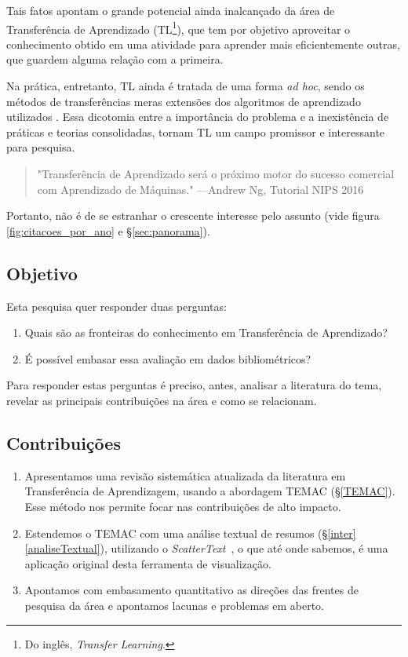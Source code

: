 \documentclass[sigconf]{acmart}
\begin{document}
  Tais fatos apontam  o grande potencial ainda inalcançado da área de Transferência de Aprendizado (TL\footnote{Do inglês, \emph{Transfer Learning}.}), que tem por objetivo aproveitar o conhecimento obtido em uma atividade para aprender mais eficientemente outras, que guardem alguma relação com a primeira.
  
  Na prática, entretanto, TL ainda é tratada de uma forma \textit{ad hoc}, sendo os métodos de transferências meras extensões dos algoritmos de aprendizado utilizados \cite{torrey}. Essa dicotomia entre a importância do problema e a inexistência de práticas e teorias consolidadas, tornam TL um campo promissor e interessante para pesquisa. 
  
  \begin{quote} "Transferência de Aprendizado será o próximo motor do sucesso comercial com Aprendizado de Máquinas." \hfill ---Andrew Ng, Tutorial NIPS 2016 \cite{ANg}
  \end{quote}

  Portanto, não é de se estranhar o crescente interesse pelo assunto (vide figura \ref{fig:citacoes_por_ano} e \S\ref{sec:panorama}).  

  \subsection{Objetivo}
   Esta pesquisa quer responder duas perguntas:
    \begin{enumerate}
      \item{Quais são as fronteiras do conhecimento em Transferência de Aprendizado?}
      \item {É possível embasar essa avaliação em dados bibliométricos?}
    \end{enumerate}
    Para responder estas perguntas é preciso, antes, analisar a literatura do tema, revelar as principais contribuições na área e como se relacionam.
  
  \subsection{Contribuições}

    \begin{enumerate}[C1.]
      \item Apresentamos uma revisão sistemática atualizada da literatura em Transferência de Aprendizagem, usando a abordagem TEMAC (\S \ref{TEMAC}). Esse método nos permite focar nas contribuições de alto impacto. 
      \item Estendemos o TEMAC com uma análise textual de resumos (\S \ref{inter}\ref{analiseTextual}), utilizando o \emph{ScatterText}~\cite{kessler2017scattertext}, o que até onde sabemos, é uma aplicação original desta ferramenta de visualização.
      \item Apontamos com embasamento quantitativo as direções das frentes de pesquisa da área e apontamos lacunas e problemas em aberto.
    \end{enumerate}
  
\end{document}
